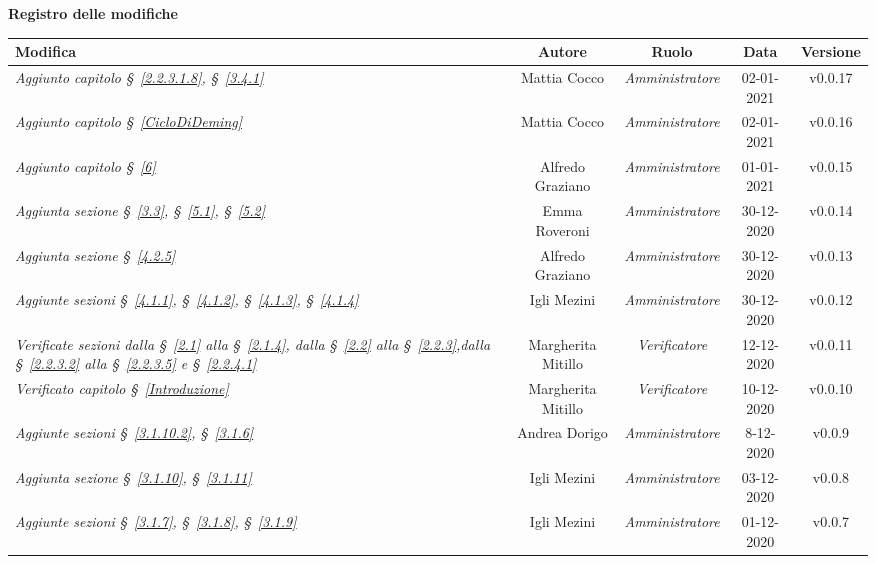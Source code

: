 \quad
\begin{center}
	\LARGE\textbf{Registro delle modifiche}
\end{center}

\def\tabularxcolumn#1{m{#1}}
{

\begin{center}
		\renewcommand{\arraystretch}{1.4}
	\begin{tabularx}{\textwidth}{|X|c|c|c|c|}
		\hline
		\rowcolor{airforceblue}
		\textbf{Modifica} & \textbf{Autore} & \textbf{Ruolo} & \textbf{Data} & \textbf{Versione}
		\\
		\hline
		\textit{Aggiunto capitolo \S~\ref{2.2.3.1.8}, \S~\ref{3.4.1}} & Mattia Cocco & \textit{Amministratore} & 02-01-2021 & v0.0.17	
		\\
		\hline
		\textit{Aggiunto capitolo \S~\ref{CicloDiDeming}} & Mattia Cocco & \textit{Amministratore} & 02-01-2021 & v0.0.16
		\\
		\hline
		\textit{Aggiunto capitolo \S~\ref{6}} & Alfredo Graziano & \textit{Amministratore} & 01-01-2021 & v0.0.15
		\\
		\hline
		\textit{Aggiunta sezione \S~\ref{3.3}, \S~\ref{5.1}, \S~\ref{5.2}} & Emma Roveroni & \textit{Amministratore} & 30-12-2020 & v0.0.14
		\\
		\hline
		\textit{Aggiunta sezione \S~\ref{4.2.5} } & Alfredo Graziano & \textit{Amministratore} & 30-12-2020 & v0.0.13
		\\
		\hline
		\textit{Aggiunte sezioni \S~\ref{4.1.1}, \S~\ref{4.1.2}, \S~\ref{4.1.3}, \S~\ref{4.1.4} } & Igli Mezini & \textit{Amministratore} & 30-12-2020 & v0.0.12
		\\
		\hline
		\textit{Verificate sezioni dalla \S~\ref{2.1} alla \S~\ref{2.1.4}, dalla \S~\ref{2.2} alla \S~\ref{2.2.3},dalla \S~\ref{2.2.3.2} alla \S~\ref{2.2.3.5} e \S~\ref{2.2.4.1}} & Margherita Mitillo & \textit{Verificatore} & 12-12-2020 & v0.0.11
		\\
		\hline
		\textit{Verificato capitolo \S~\ref{Introduzione}} & Margherita Mitillo & \textit{Verificatore} & 10-12-2020 & v0.0.10
		\\
		\hline
		\textit{Aggiunte sezioni \S~\ref{3.1.10.2}, \S~\ref{3.1.6}} & Andrea Dorigo & \textit{Amministratore} & 8-12-2020 & v0.0.9
		\\
		\hline
		\textit{Aggiunta sezione \S~\ref{3.1.10}, \S~\ref{3.1.11}} & Igli Mezini & \textit{Amministratore} & 03-12-2020 & v0.0.8
		\\
		\hline
		\textit{Aggiunte sezioni \S~\ref{3.1.7}, \S~\ref{3.1.8}, \S~\ref{3.1.9}} & Igli Mezini & \textit{Amministratore} & 01-12-2020 & v0.0.7

\end{tabularx}
\end{center}}
